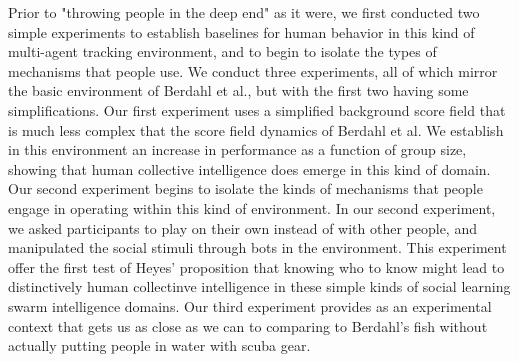 \documentclass[12pt,letterpaper]{article}
\begin{document}
Prior to "throwing people in the deep end" as it were, we first conducted two simple experiments to establish baselines for human behavior in this kind of multi-agent tracking environment, and to begin to isolate the types of mechanisms that people use.  We conduct three experiments, all of which mirror the basic environment of Berdahl et al., but with the first two having some simplifications. Our first experiment uses a simplified background score field that is much less complex that the score field dynamics of Berdahl et al.  We establish in this environment an increase in performance as a function of group size, showing that human collective intelligence does emerge in this kind of domain. Our second experiment begins to isolate the kinds of mechanisms that people engage in operating within this kind of environment.  In our second experiment, we asked participants to play on their own instead of with other people, and manipulated the social stimuli through bots in the environment.  This experiment offer the first test of Heyes' proposition that knowing who to know might lead to distinctively human collectinve intelligence in these simple kinds of social learning swarm intelligence domains.  Our third experiment provides as an experimental context that gets us as close as we can to comparing to Berdahl's fish without actually putting people in water with scuba gear. 
\end{document}
